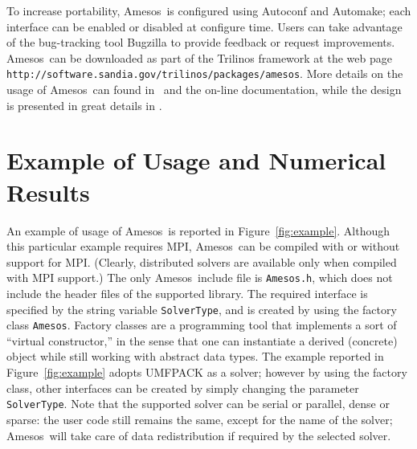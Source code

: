 \documentclass{llncs}
\newcommand{\amesos}{{\sc Amesos}}
\begin{document}
To increase portability, \amesos\ is configured using
Autoconf and Automake; each
interface can be enabled or disabled at configure time. Users can
take advantage of the bug-tracking tool Bugzilla to
provide feedback or request improvements. \amesos\ can be downloaded as part of
the Trilinos framework at the web
page
\verb!http://software.sandia.gov/trilinos/packages/amesos!. More details on
the usage of \amesos\ can found in~\cite{Amesos-Reference-Guide} and the
on-line documentation, while the
design is presented in great details in \cite{sala06design}.

\section{Example of Usage and Numerical Results}
\label{sec:numerical}

An example of usage of \amesos\ is reported in Figure~\ref{fig:example}.
Although this particular example requires MPI, \amesos\ can be compiled with
or without support for MPI.  (Clearly, distributed solvers are available only
when compiled with MPI support.) The only \amesos\ include file is
\verb!Amesos.h!, which does not include the header files of the supported
library.  The required interface is specified by the string variable
\verb!SolverType!, and is created by using the factory class \verb!Amesos!.
Factory classes are a programming tool that implements a sort of ``virtual
constructor,'' in the sense that one can instantiate a derived (concrete)
object while still working with abstract data types. The example reported in
Figure~\ref{fig:example} adopts UMFPACK as a solver; however by using the
factory class, other interfaces can be created by simply changing the
parameter {\tt SolverType}. Note that the supported solver can be serial or
parallel, dense or sparse: the user code still remains the same, except for
the name of the solver; \amesos\ will take care of data redistribution if
required by the selected solver.
\end{document}
